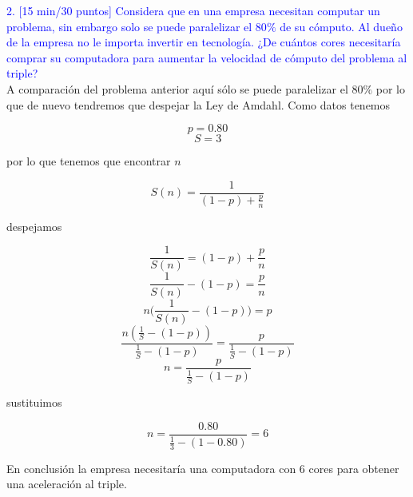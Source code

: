 \textcolor{blue}{2. [15 min/30 puntos] Considera que en una empresa necesitan computar un problema, sin
embargo solo se puede paralelizar el 80$\%$ de su cómputo. Al dueño de la empresa no le importa
invertir en tecnología. ¿De cuántos cores necesitaría comprar su computadora para aumentar la
velocidad de cómputo del problema al triple?}\\

A comparación del problema anterior aquí sólo se puede paralelizar el 80$\%$ por lo que de nuevo tendremos que despejar la Ley de Amdahl. Como datos tenemos 

$$p = 0.80$$
$$S=3$$

por lo que tenemos que encontrar $n$

$$S(n)=\frac{1}{(1-p)+\frac{p}{n}} $$

despejamos 

$$\frac{1}{S(n)}= (1-p)+\frac{p}{n}$$
$$\frac{1}{S(n)}-(1-p)=\frac{p}{n}$$
$$n\Big(\frac{1}{S(n)}-(1-p)\Big)=p$$
$$\frac{n(\frac{1}{S}-(1-p))}{\frac{1}{S}-(1-p)}= \frac{p}{\frac{1}{S}-(1-p)}$$
$$n = \frac{p}{\frac{1}{S}-(1-p)}$$

sustituimos

$$ n = \frac{0.80}{\frac{1}{3}-(1-0.80)}= 6$$

En conclusión la empresa necesitaría una computadora con 6 cores para obtener una aceleración al triple.\\